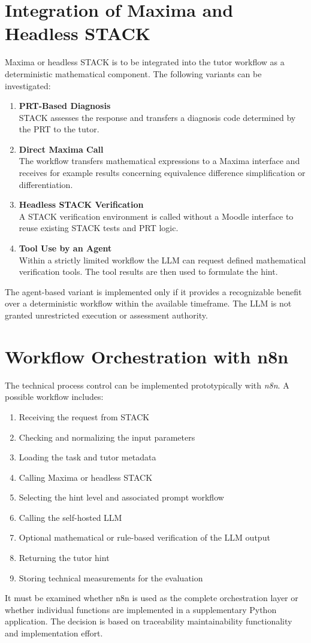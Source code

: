 \documentclass[11pt,a4paper,oneside,ngerman]{memoir}
\begin{document}
\section{Integration of Maxima and Headless STACK}
Maxima or headless STACK is to be integrated into the tutor workflow as a deterministic mathematical component. The following variants can be investigated:
\begin{enumerate}
    \item \textbf{PRT-Based Diagnosis} \\
    STACK assesses the response and transfers a diagnosis code determined by the PRT to the tutor.
    \item \textbf{Direct Maxima Call} \\
    The workflow transfers mathematical expressions to a Maxima interface and receives for example results concerning equivalence difference simplification or differentiation.
    \item \textbf{Headless STACK Verification} \\
    A STACK verification environment is called without a Moodle interface to reuse existing STACK tests and PRT logic.
    \item \textbf{Tool Use by an Agent} \\
    Within a strictly limited workflow the LLM can request defined mathematical verification tools. The tool results are then used to formulate the hint.
\end{enumerate}
The agent-based variant is implemented only if it provides a recognizable benefit over a deterministic workflow within the available timeframe. The LLM is not granted unrestricted execution or assessment authority.
\section{Workflow Orchestration with n8n}
The technical process control can be implemented prototypically with \textit{n8n}. A possible workflow includes:
\begin{enumerate}
    \item Receiving the request from STACK
    \item Checking and normalizing the input parameters
    \item Loading the task and tutor metadata
    \item Calling Maxima or headless STACK
    \item Selecting the hint level and associated prompt workflow
    \item Calling the self-hosted LLM
    \item Optional mathematical or rule-based verification of the LLM output
    \item Returning the tutor hint
    \item Storing technical measurements for the evaluation
\end{enumerate}
It must be examined whether n8n is used as the complete orchestration layer or whether individual functions are implemented in a supplementary Python application. The decision is based on traceability maintainability functionality and implementation effort.
\end{document}
